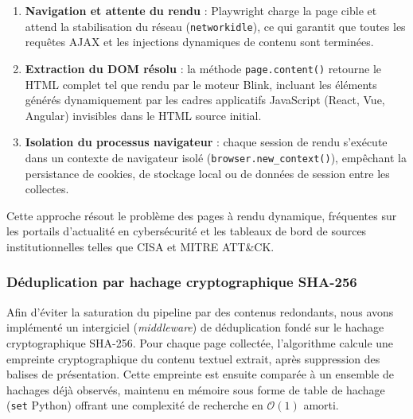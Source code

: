 \begin{enumerate}
    \item \textbf{Navigation et attente du rendu} : Playwright charge la page cible et attend la stabilisation du réseau (\texttt{networkidle}), ce qui garantit que toutes les requêtes AJAX et les injections dynamiques de contenu sont terminées.
    \item \textbf{Extraction du DOM résolu} : la méthode \texttt{page.content()} retourne le HTML complet tel que rendu par le moteur Blink, incluant les éléments générés dynamiquement par les cadres applicatifs JavaScript (React, Vue, Angular) invisibles dans le HTML source initial.
    \item \textbf{Isolation du processus navigateur} : chaque session de rendu s'exécute dans un contexte de navigateur isolé (\texttt{browser.new\_context()}), empêchant la persistance de cookies, de stockage local ou de données de session entre les collectes.
\end{enumerate}

Cette approche résout le problème des pages à rendu dynamique, fréquentes sur les portails d'actualité en cybersécurité et les tableaux de bord de sources institutionnelles telles que CISA et MITRE ATT\&CK.

\subsubsection{Déduplication par hachage cryptographique SHA-256}

Afin d'éviter la saturation du pipeline par des contenus redondants, nous avons implémenté un intergiciel (\textit{middleware}) de déduplication fondé sur le hachage cryptographique SHA-256. Pour chaque page collectée, l'algorithme calcule une empreinte cryptographique du contenu textuel extrait, après suppression des balises de présentation. Cette empreinte est ensuite comparée à un ensemble de hachages déjà observés, maintenu en mémoire sous forme de table de hachage (\texttt{set} Python) offrant une complexité de recherche en $\mathcal{O}(1)$ amorti.

